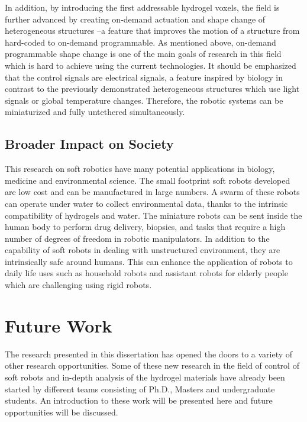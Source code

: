 In addition, by introducing the first addressable hydrogel voxels,  the field is further advanced by creating on-demand actuation and shape change of heterogeneous structures --a feature that improves the motion of a structure from hard-coded to on-demand programmable. As mentioned above, on-demand programmable shape change is one of the main goals of research in this field which is hard to achieve using the current technologies. It should be emphasized that the control signals are electrical signals, a feature inspired by biology in contrast to the previously demonstrated heterogeneous structures which use light signals or global temperature changes. Therefore, the robotic systems can be miniaturized and fully untethered simultaneously.
\subsection{Broader Impact on Society}
This research on soft robotics have many potential applications in biology, medicine and environmental science. The small footprint soft robots developed are low cost and can be manufactured in large numbers. A swarm of these robots can operate under water to collect environmental data, thanks to the intrinsic compatibility of hydrogels and water. The miniature robots can be sent inside the human body to perform drug delivery, biopsies, and tasks that require a high number of degrees of freedom in robotic manipulators.
In addition to the capability of soft robots in dealing with unstructured environment, they are intrinsically safe around humans. This can enhance the application of robots to daily life uses such as household robots and assistant robots for elderly people which are challenging using rigid robots.
\section{Future Work}
The research presented in this dissertation has opened the doors to a variety of other research opportunities. Some of these new research in the field of control of soft robots and in-depth analysis of the hydrogel materials  have already been started by different teams consisting of Ph.D., Masters and undergraduate students. An introduction to these work will be presented here and future opportunities will be discussed.
